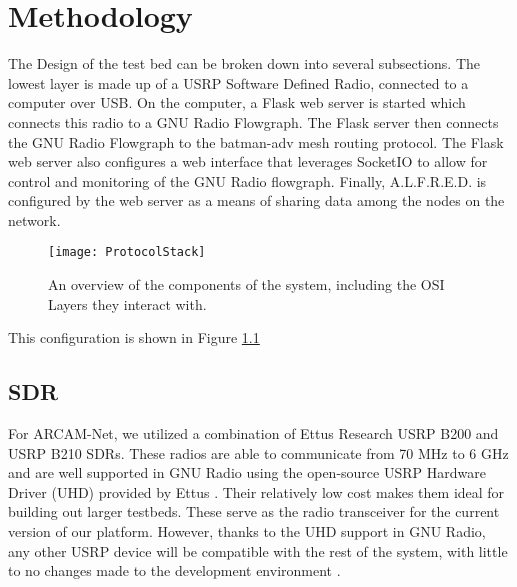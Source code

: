 
\chapter{Methodology} %

\label{Chapter3} %




The Design of the test bed can be broken down into several subsections. The lowest layer is made up of a USRP Software Defined Radio, connected to a computer over USB. On the computer, a Flask web server is started which connects this radio to a GNU Radio Flowgraph. The Flask server then connects the GNU Radio Flowgraph to the batman-adv mesh routing protocol. The Flask web server also configures a web interface that leverages SocketIO to allow for control and monitoring of the GNU Radio flowgraph. Finally, A.L.F.R.E.D. is configured by the web server as a means of sharing data among the nodes on the network. 

\begin{figure}
	\centering
	\texttt{[image: ProtocolStack]}
	\caption{An overview of the components of the system, including the OSI Layers they interact with. \cite{selfpaper} \cite{0003} \cite{0007} \cite{0008} \cite{0015} \cite{0012} \cite{0011}}
	\label{fig:ProtocolStack}
\end{figure}

This configuration is shown in Figure \ref{fig:ProtocolStack}

\section{SDR}

For ARCAM-Net, we utilized a combination of Ettus Research USRP B200 and USRP B210 SDRs. These radios are able to communicate from 70 MHz to 6 GHz and are well supported in GNU Radio using the open-source USRP Hardware Driver (UHD) provided by Ettus \cite{0007}. Their relatively low cost makes them ideal for building out larger testbeds. These serve as the radio transceiver for the current version of our platform. However, thanks to the UHD support in GNU Radio, any other USRP device will be compatible with the rest of the system, with little to no changes made to the development environment \cite{6737601}. 

